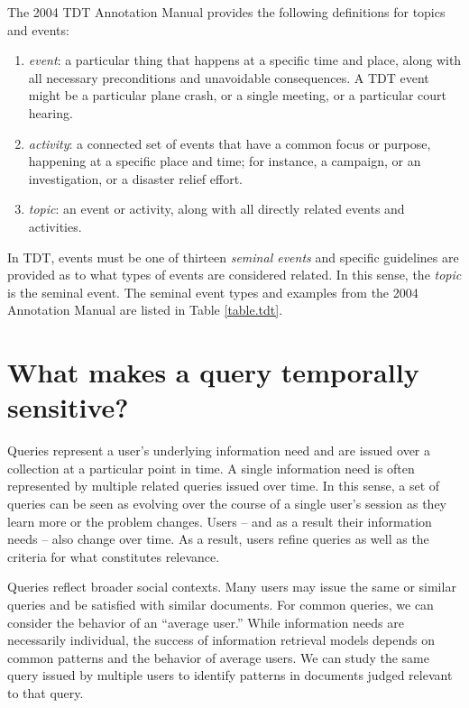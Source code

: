 \documentclass{sig-alternate}
\begin{document}
The 2004 TDT Annotation Manual provides the following definitions for topics and events:

\begin{enumerate}
\item \emph{event}:  a particular thing that happens at a specific time and place, along with all necessary preconditions and unavoidable consequences. A
TDT event might be a particular plane crash, or a single meeting, or a particular court hearing. 
\item \emph{activity}:  a connected set of events that have a common focus or purpose, happening at a specific place and time; for instance, a
campaign, or an investigation, or a disaster relief effort. 
\item \emph{topic}: an event or activity, along with all directly related events and activities. 
\end{enumerate}

In TDT, events must be one of thirteen \emph{seminal events} and specific guidelines are provided as to what types of events are considered related.  In this sense, the \emph{topic} is the seminal event. The seminal event types and  examples from the 2004 Annotation Manual are listed in Table \ref{table.tdt}. 

\section{What makes a query temporally sensitive?}

Queries represent a user's underlying information need and are issued over a collection at a particular point in time.  A single information need is often represented by multiple related queries issued over time. In this sense, a set of queries can be seen as evolving over the course of a single user's session as they learn more or the problem changes. Users -- and as a result their information needs -- also change over time. As a result, users refine queries as well as the criteria for what constitutes relevance. 

Queries reflect broader social contexts. Many users may issue the same or similar queries and be satisfied with similar documents.  For common queries, we can consider the behavior of an ``average user.'' While information needs are necessarily individual, the success of information retrieval models depends on common patterns and the behavior of average users. We can study the same query issued by multiple users to identify patterns in documents judged relevant to that query. 
\end{document}
